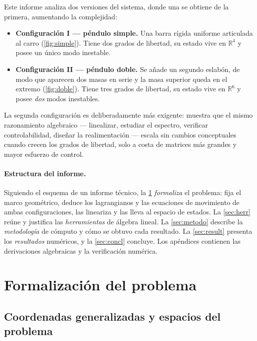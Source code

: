 \documentclass[11pt,letterpaper]{article}
\theoremstyle{definition}
\theoremstyle{plain}
\theoremstyle{remark}
\newcommand{\R}{\mathbb{R}}
\begin{document}
Este informe analiza dos versiones del
sistema, donde una se obtiene de la primera, aumentando la complejidad:

\begin{itemize}
  \item \textbf{Configuración I --- péndulo simple.} Una barra rígida
  uniforme articulada al carro (\cref{fig:simple}). Tiene dos grados de
  libertad, su estado vive en $\R^4$ y posee un único modo inestable.
  \item \textbf{Configuración II --- péndulo doble.} Se añade un segundo
  eslabón, de modo que aparecen dos masas en serie y la masa superior
  queda en el extremo (\cref{fig:doble}). Tiene tres grados de libertad,
  su estado vive en $\R^6$ y posee \emph{dos} modos inestables.
\end{itemize}


La segunda configuración es deliberadamente más exigente: muestra que el
mismo razonamiento algebraico --- linealizar, estudiar el espectro,
verificar controlabilidad, diseñar la realimentación --- escala sin
cambios conceptuales cuando crecen los grados de libertad, solo a costa
de matrices más grandes y mayor esfuerzo de control.

\paragraph{Estructura del informe.} Siguiendo el esquema de un informe
técnico, la \cref{sec:formal} \emph{formaliza} el problema: fija el marco
geométrico, deduce los lagrangianos y las ecuaciones de movimiento de
ambas configuraciones, las lineariza y las lleva al espacio de estados.
La \cref{sec:herr} reúne y justifica las \emph{herramientas} de álgebra
lineal. La \cref{sec:metodo} describe la \emph{metodología} de cómputo y
cómo se obtuvo cada resultado. La \cref{sec:result} presenta los
\emph{resultados} numéricos, y la \cref{sec:concl} concluye. Los
apéndices contienen las derivaciones algebraicas y la verificación
numérica.

\section{Formalización del problema}
\label{sec:formal}

\subsection{Coordenadas generalizadas y espacios del problema}
\label{sub:espacios}
\end{document}
